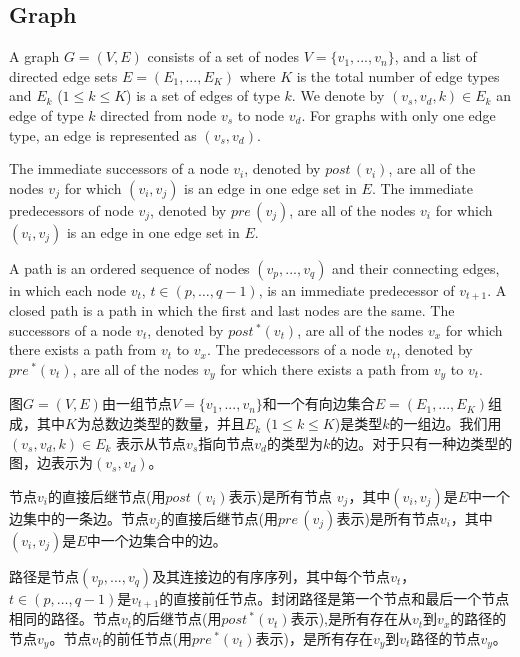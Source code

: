 \subsection{Graph}\label{sec:related:graph}



\label{subsection:gra}
A graph $G\! =\! (V, E)$ consists of a set of nodes $V \!= \!\{v_1, ..., v_n\}$, and a list of directed edge sets $E = (E_1, . . . , E_K)$ where $K$ is the total number of edge types and $E_k$ ($1 \leq k \leq K$) is a set of edges of type $k$. We denote by $(v_s, v_d, k) \in E_k$ an edge of type $k$ directed from node $v_s$ to node $v_d$. For graphs with only one edge type, an edge is represented as $(v_s, v_d)$.

The immediate successors of a node $v_i$, denoted by $\textit{post}\,(v_i)$, are all of the nodes $v_j$ for which $(v_i, v_j)$ is an edge in one edge set in $E$. The immediate predecessors of node $v_j$, denoted by $\textit{pre}\,(v_j)$, are all of the nodes $v_i$ for which $(v_i, v_j)$ is an edge in one edge set in $E$. 

A path is an ordered sequence of nodes $(v_p,..., v_q)$ and their connecting edges, in which each node $v_t$, $t\in(p,\dots,q-1)$, is an immediate predecessor of $v_{t+1}$. A closed path is a path in which the first and last nodes are the same. The successors of a node $v_t$, denoted by $\textit{post}\,^{*}(v_t)$, are all of the nodes $v_x$ for which there exists a path from $v_t$ to $v_x$. The predecessors of a node $v_t$, denoted by $\textit{pre}\,^{*}(v_t)$, are all of the nodes $v_y$ for which there exists a path from $v_y$ to $v_t$.

图$G\! =\! (V, E)$由一组节点$V \!= \!\{v_1, ..., v_n\}$和一个有向边集合$E = (E_1, . . . , E_K)$组成，其中$K$为总数边类型的数量，并且$E_k$ ($1 \leq k \leq K$)是类型$k$的一组边。我们用 $(v_s, v_d, k) \in E_k$ 表示从节点$v_s$指向节点$v_d$的类型为$k$的边。对于只有一种边类型的图，边表示为$(v_s, v_d)$。

节点$v_i$的直接后继节点(用$\textit{post}\,(v_i)$表示)是所有节点 $v_j$，其中$(v_i, v_j)$是$E$中一个边集中的一条边。节点$v_j$的直接后继节点(用$\textit{pre}\,(v_j)$表示)是所有节点$v_i$，其中$(v_i, v_j)$是$E$中一个边集合中的边。

路径是节点$(v_p,..., v_q)$及其连接边的有序序列，其中每个节点$v_t$，$t\in(p,\dots,q-1)$是$v_{t+1}$的直接前任节点。封闭路径是第一个节点和最后一个节点相同的路径。节点$v_t$的后继节点(用$\textit{post}\,^{*}(v_t)$表示),是所有存在从$v_t$到$v_x$的路径的节点$v_y$。节点$v_t$的前任节点(用$\textit{pre}\,^{*}(v_t)$表示)，是所有存在$v_y$到$v_t$路径的节点$v_y$。

